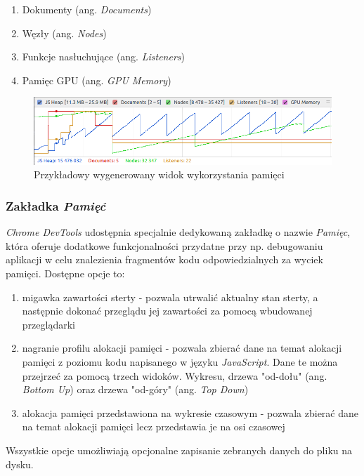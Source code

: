 \documentclass[polish, twoside, 12pt]{mwart}
\begin{document}
\begin{enumerate}
  \item Dokumenty (ang. \emph{Documents})
  \item Węzły (ang. \emph{Nodes})
  \item Funkcje nasłuchujące (ang. \emph{Listeners})
  \item Pamięc GPU (ang. \emph{GPU Memory})
\end{enumerate}

\begin{figure}[ht]
  \includegraphics[width=\textwidth]{chrome-devtools-performance-memory-view.png}
	\caption{Przykładowy wygenerowany widok wykorzystania pamięci}
\end{figure}

\subsubsection{Zakładka \emph{Pamięć}}

\emph{Chrome DevTools} udostępnia specjalnie dedykowaną zakładkę o nazwie \emph{Pamięc}, która oferuje dodatkowe funkcjonalności przydatne przy np. debugowaniu aplikacji w celu znalezienia fragmentów kodu odpowiedzialnych za wyciek pamięci. Dostępne opcje to:

\begin{enumerate}
  \item migawka zawartości sterty - pozwala utrwalić aktualny stan sterty, a następnie dokonać przeglądu jej zawartości za pomocą wbudowanej przeglądarki
  \item nagranie profilu alokacji pamięci - pozwala zbierać dane na temat alokacji pamięci z poziomu kodu napisanego w języku \emph{JavaScript}. Dane te można przejrzeć za pomocą trzech widoków. Wykresu, drzewa "od-dołu" (ang. \emph{Bottom Up}) oraz drzewa "od-góry" (ang. \emph{Top Down})
  \item alokacja pamięci przedstawiona na wykresie czasowym - pozwala zbierać dane na temat alokacji pamięci lecz przedstawia je na osi czasowej
\end{enumerate}

Wszystkie opcje umożliwiają opcjonalne zapisanie zebranych danych do pliku na dysku.
\end{document}
